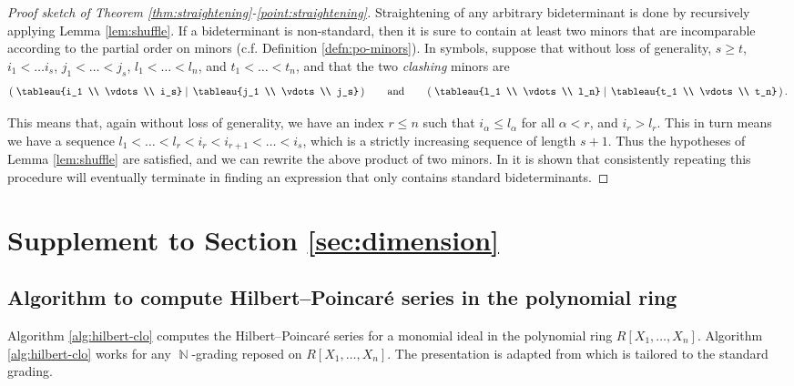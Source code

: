 \documentclass[11pt,reqno]{amsart}
\DeclareMathOperator{\N}{\mathbb{N}}
\newcommand{\bigbidet}[2]{\left(\,\left. #1\;\right|\;#2\,\right)}
\theoremstyle{definition}
\numberwithin{equation}{section}
\begin{document}
\begin{proof}[Proof sketch of Theorem \ref{thm:straightening}-\ref{point:straightening}]
Straightening of any arbitrary bideterminant is done by recursively applying Lemma \ref{lem:shuffle}. If a bideterminant is non-standard, then it is sure to contain at least two minors that are incomparable according to the partial order on minors (c.f. Definition \ref{defn:po-minors}). In symbols, suppose that without loss of generality, $s \ge t$, $i_1 < \ldots i_s$, $j_1 < \ldots < j_s$, $l_1 < \ldots < l_n$, and $t_1 < \ldots < t_n$, and that the two \emph{clashing} minors are 
\[\bigbidet{\tableau{i_1 \\ \vdots \\ i_s}}{\tableau{j_1 \\ \vdots \\ j_s}} \qquad \text{and} \qquad \bigbidet{\tableau{l_1 \\ \vdots \\ l_n}}{\tableau{t_1 \\ \vdots \\ t_n}}.\] 

This means that, again without loss of generality, we have an index $r \le n$ such that $i_{\alpha} \le l_{\alpha}$ for all $\alpha < r$, and $i_r > l_r$. This in turn means we have a sequence $l_1 < \ldots < l_r < i_r < i_{r+1} < \ldots < i_s$, which is a strictly increasing sequence of length $s+1$. Thus the hypotheses of Lemma \ref{lem:shuffle} are satisfied, and we can rewrite the above product of two minors. In \cite[Theorem~3.2]{grinberginvariant} it is shown that consistently repeating this procedure will eventually terminate in finding an expression that only contains standard bideterminants.
\end{proof}

\section{Supplement to Section \ref{sec:dimension}}

\subsection{Algorithm to compute Hilbert--Poincar\'e series in the polynomial ring}
\label{sec:app:hilbert-series-algorithm}

Algorithm \ref{alg:hilbert-clo} computes the Hilbert--Poincar\'e series for a monomial ideal in the polynomial ring $R[X_1, \ldots, X_n]$. Algorithm \ref{alg:hilbert-clo} works for any $\N$-grading reposed on $R[X_1, \ldots, X_n]$. The presentation is adapted from \cite[Chapter 10 - \S 2, Theorem 6]{CLO} which is tailored to the standard grading.
\end{document}
